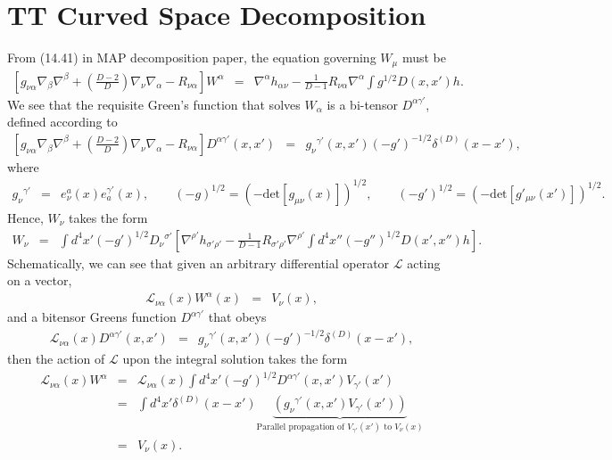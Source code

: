 \documentclass[10pt,letterpaper]{article}
\begin{document}
\section{TT Curved Space Decomposition}
From (14.41) in MAP decomposition paper, the equation governing $W_\mu$ must be
\begin{eqnarray}
\left[g_{\nu\alpha}\nabla_\beta\nabla^\beta + \left(\frac{D-2}{D}\right)\nabla_\nu \nabla_\alpha - R_{\nu\alpha}\right]W^\alpha
&=& \nabla^\alpha h_{\alpha\nu} - \frac{1}{D-1}R_{\nu\alpha}\nabla^\alpha \int g^{1/2} D(x,x') h.
\label{treq4}
\end{eqnarray}
We see that the requisite Green's function that solves $W_\alpha$ is a bi-tensor $D^{\alpha\gamma'}$, defined according to
\begin{eqnarray}
\left[g_{\nu\alpha}\nabla_\beta\nabla^\beta + \left(\frac{D-2}{D}\right)\nabla_\nu \nabla_\alpha - R_{\nu\alpha}\right]D^{\alpha\gamma'}(x,x') &=& g_{\nu}{}^{\gamma'}(x,x') (-g')^{-1/2} \delta^{(D)}(x-x'),
\end{eqnarray}
where 
\begin{eqnarray}
g_{\nu}{}^{\gamma'} &=& e_\nu^a(x)e_a^{\gamma'}(x),\qquad (-g)^{1/2} = (-\text{det}[g_{\mu\nu}(x)])^{1/2},\qquad  (-g')^{1/2} = (-\text{det}[g'_{\mu\nu}(x')])^{1/2}.
\end{eqnarray}
Hence, $W_\nu$ takes the form
\begin{eqnarray}
W_{\nu} &=& \int d^4x' (-g')^{1/2} D_\nu{}^{\sigma'} \left[ \nabla^{\rho'} h_{\sigma'\rho'}-
\frac{1}{D-1}R_{\sigma'\rho'}\nabla^{\rho'} \int d^4x'' (-g'')^{1/2} D(x',x'') h\right].
\end{eqnarray}
Schematically, we can see that given an arbitrary differential operator $\mathcal L$ acting on a vector,
\begin{eqnarray}
\mathcal L_{\nu\alpha}(x)W^\alpha(x) &=& V_\nu (x),
\end{eqnarray}
and a bitensor Greens function $D^{\alpha\gamma'}$ that obeys
\begin{eqnarray}
\mathcal L_{\nu\alpha}(x)D^{\alpha\gamma'}(x,x') &=&  g_{\nu}{}^{\gamma'}(x,x') (-g')^{-1/2} \delta^{(D)}(x-x'),
\end{eqnarray}
then the action of $\mathcal L$ upon the integral solution takes the form
\begin{eqnarray}
\mathcal L_{\nu\alpha}(x) W^\alpha &=& \mathcal L_{\nu\alpha}(x) \int d^4x' (-g')^{1/2}D^{\alpha\gamma'}(x,x')V_{\gamma'}(x')
\nonumber\\
  &=& \int d^4x' \delta^{(D)}(x-x')\underbrace{ \left( g_{\nu}{}^{\gamma'}(x,x') V_{\gamma'}(x')\right)}_{\text{Parallel propagation of $V_{\gamma'}(x')$ to $V_\nu(x)$}}
\nonumber\\
&=& V_\nu(x).
\end{eqnarray}
\\ \\
\end{document}

